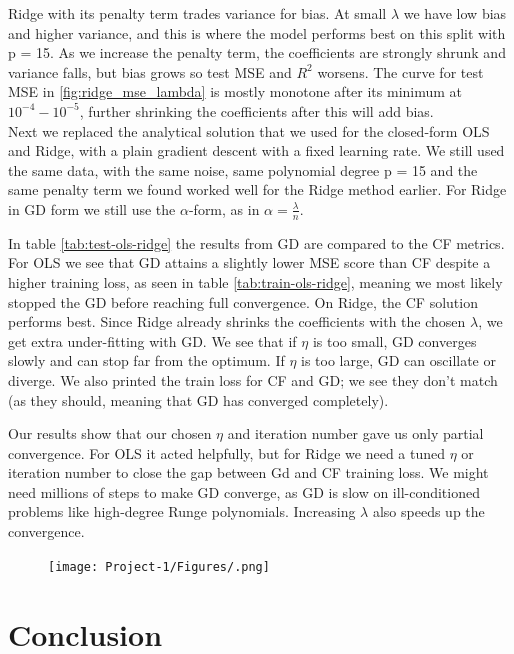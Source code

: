\documentclass[amssymb,twocolumn,aps]{revtex4-2}
\begin{document}
Ridge with its penalty term trades variance for bias. At small $\lambda$ we have low bias and higher variance, and this is where the model performs best on this split with p = 15. As we increase the penalty term, the coefficients are strongly shrunk and variance falls, but bias grows so test MSE and $R^2$ worsens. The curve for test MSE in \ref{fig:ridge_mse_lambda} is mostly monotone after its minimum at $10^{-4}-10^{-5}$, further shrinking the coefficients after this will add bias. \\

Next we replaced the analytical solution that we used for the closed-form OLS and Ridge, with a plain gradient descent with a fixed learning rate. We still used the same data, with the same noise, same polynomial degree p = 15 and the same penalty term we found worked well for the Ridge method earlier. For Ridge in GD form we still use the $\alpha$-form, as in $\alpha=\frac{\lambda}{n}$. 

In table \ref{tab:test-ols-ridge} the results from GD are compared to the CF metrics. For OLS we see that GD attains a slightly lower MSE score than CF despite a higher training loss, as seen in table \ref{tab:train-ols-ridge}, meaning we most likely stopped the GD before reaching full convergence. On Ridge, the CF solution performs best. Since Ridge already shrinks the coefficients with the chosen $\lambda$, we get extra under-fitting with GD. We see that if $\eta$ is too small, GD converges slowly and can stop far from the optimum. If $\eta$ is too large, GD can oscillate or diverge. We also printed the train loss for CF and GD; we see they don't match (as they should, meaning that GD has converged completely).

Our results show that our chosen $\eta$ and iteration number gave us only partial convergence. For OLS it acted helpfully, but for Ridge we need a tuned $\eta$ or iteration number to close the gap between Gd and CF training loss. We might need millions of steps to make GD converge, as GD is slow on ill-conditioned problems like high-degree Runge polynomials. Increasing $\lambda$ also speeds up the convergence. 



\begin{figure}[H]
    \centering
    \texttt{[image: Project-1/Figures/.png]}
    \caption{}
    \label{fig:}
\end{figure}




\section{Conclusion}\label{section:conclusion} 
\end{document}
